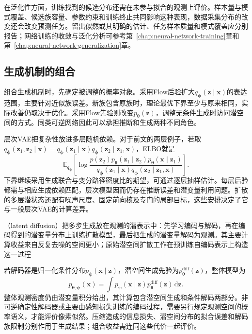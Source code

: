 在泛化性方面，训练找到的候选分布还需在未参与拟合的观测上评价。样本量与模式覆盖、候选族容量、参数约束和训练终止共同影响这种表现，数据采集分布的改变还会改变预测任务。留出似然或其明确的估计、任务样本质量和模式覆盖应分别报告；网络训练的收敛与泛化分析可参考第~\ref{chap:neural-network-training}章和第~\ref{chap:neural-network-generalization}章。

\subsection{生成机制的组合}
\label{sec:pgm-generative-hybrids}

组合生成机制时，先确定被调整的概率对象。采用Flow后验扩大$q_{\bm{\phi}}(\bm{z}\mid\bm{x})$的表达范围，主要针对近似族误差。新族包含原族时，理论最优下界至少与原来相同，实际改善仍取决于优化。采用Flow先验则改变$p_{\bm{\theta}}(\bm{z})$，调整无条件生成时访问潜空间的方式。同类可逆网络因此可以承担推断和生成两种不同角色。

层次VAE把复杂性放进多层随机依赖。对于前文的两层例子，若取$q_{\bm{\phi}}(\bm{z}_1,\bm{z}_2\mid\bm{x})=q_{\bm{\phi}}(\bm{z}_1\mid\bm{x})q_{\bm{\phi}}(\bm{z}_2\mid\bm{z}_1,\bm{x})$，ELBO就是
\[
  \mathbb{E}_{q_{\bm{\phi}}}
  \left[
    \log\frac{
      p(\bm{z}_2)p_{\bm{\theta}}(\bm{z}_1\mid\bm{z}_2)
          p_{\bm{\theta}}(\bm{x}\mid\bm{z}_1)}
      {q_{\bm{\phi}}(\bm{z}_1\mid\bm{x})
          q_{\bm{\phi}}(\bm{z}_2\mid\bm{z}_1,\bm{x})}
  \right].
\]
下界继续采用生成联合与变分路径密度比的期望，可通过逐层抽样估计。每层后验都需与相应生成依赖匹配，层次模型因而仍存在推断误差和潜变量利用问题。扩散的多层潜状态还配有噪声尺度、固定前向核及专门的局部目标，这些安排决定了它与一般层次VAE的计算差异。

（latent diffusion）把多步生成放在观测的潜表示中：先学习编码与解码，再在编码得到的潜变量分布上训练扩散模型，最后把生成的潜变量解码为观测。其主要计算收益来自反复去噪的空间更小；原始潜空间扩散工作在预训练自编码表示上构造这一过程

若解码器是归一化条件分布$p_{\bm{\psi}}(\bm{x}\mid\bm{z})$，潜空间生成先验为$p_{\bm{\theta}}^{\mathrm{diff}}(\bm{z})$，整体模型为
\begin{equation}
  \label{eq:pgm-generative-latent-diffusion}
  p_{\bm{\theta},\bm{\psi}}(\bm{x})
  =\int p_{\bm{\psi}}(\bm{x}\mid\bm{z})
          p_{\bm{\theta}}^{\mathrm{diff}}(\bm{z})\,\mathrm{d}\bm{z}.
\end{equation}
整体观测密度仍由潜变量积分给出，其计算包含潜空间生成和条件解码两部分。非可逆确定性解码器或主要由感知损失训练的编码过程，需要另行规定观测空间的概率语义，才能评价像素似然。压缩造成的信息损失、潜空间分布的拟合误差和解码族限制分别作用于生成结果；组合收益需连同这些代价一起评价。

